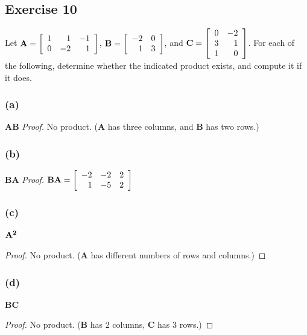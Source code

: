 \documentclass[14pt]{extarticle}
\begin{document}
\subsection{Exercise 10}
Let \({\bf A} = 
\left[ 
\begin{array}{rrr}
1 & 1 & -1 \\
0 & -2 & 1 \\
\end{array}
\right]
\), \({\bf B} = 
\left[ 
\begin{array}{rr}
-2 & 0 \\
1 & 3 \\
\end{array}
\right]
\), and \({\bf C} = 
\left[ 
\begin{array}{rr}
0 & -2 \\
3 & 1 \\
1 & 0 \\
\end{array}
\right]
\). For each of the following, determine whether the indicated product exists, and compute it if it does.

\subsubsection{(a)}
{\bf AB}\hspace{3cm}
{\it Proof.}
No product. ({\bf A} has three columns, and {\bf B} has two rows.)

\subsubsection{(b)}
{\bf BA}\hspace{3cm}
{\it Proof.}
\({\bf BA} = 
\left[ 
\begin{array}{rrr}
-2 & -2 & 2 \\
1 & -5 & 2 \\
\end{array}
\right]
\)

\subsubsection{(c)}
\({\bf A^2}\)
\begin{proof}
No product. ({\bf A} has different numbers of rows and columns.)
\end{proof}

\subsubsection{(d)}
{\bf BC}
\begin{proof}
No product. ({\bf B} has 2 columns, {\bf C} has 3 rows.)
\end{proof}
\end{document}
